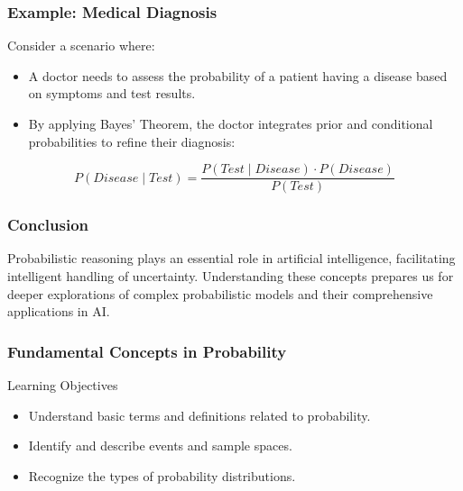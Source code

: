\documentclass[aspectratio=169]{beamer}
\begin{document}
\begin{frame}[fragile]
    \frametitle{Example: Medical Diagnosis}
    Consider a scenario where:
    \begin{itemize}
        \item A doctor needs to assess the probability of a patient having a disease based on symptoms and test results.
        \item By applying Bayes' Theorem, the doctor integrates prior and conditional probabilities to refine their diagnosis:
    \end{itemize}

    \begin{equation}
    P(Disease \mid Test) = \frac{P(Test \mid Disease) \cdot P(Disease)}{P(Test)}
    \end{equation}
\end{frame}

\begin{frame}[fragile]
    \frametitle{Conclusion}
    Probabilistic reasoning plays an essential role in artificial intelligence, facilitating intelligent handling of uncertainty. 
    Understanding these concepts prepares us for deeper explorations of complex probabilistic models and their comprehensive applications in AI.
\end{frame}

\begin{frame}[fragile]
    \frametitle{Fundamental Concepts in Probability}
    \begin{block}{Learning Objectives}
        \begin{itemize}
            \item Understand basic terms and definitions related to probability.
            \item Identify and describe events and sample spaces.
            \item Recognize the types of probability distributions.
        \end{itemize}
    \end{block}
\end{frame}
\end{document}
